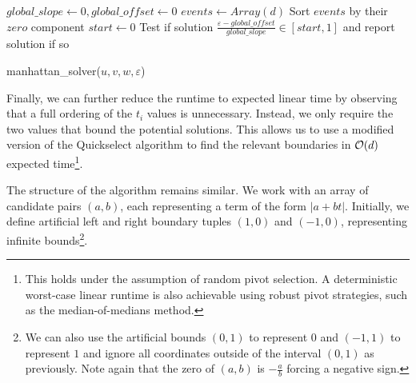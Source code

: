 \begin{algorithm}[ht]
  \DontPrintSemicolon
  \BlankLine
  \(global\_slope \gets 0, global\_offset \gets 0\) \;
  \(events \gets Array(d)\)
  Sort \(events\) by their \(zero\) component\;
  \(start \gets 0\)\;
  Test if solution \(\frac{\varepsilon - global\_offset}{global\_slope} \in [start, 1]\) and report solution if so\;

  \caption{manhattan\_solver(\(u, v, w, \varepsilon\))}
  \label{algo:solve_manhattan}
\end{algorithm}

Finally, we can further reduce the runtime to expected linear time by observing that a full ordering of the \(t_i\) values is unnecessary. Instead, we only require the two values that bound the potential solutions. This allows us to use a modified version of the Quickselect algorithm to find the relevant boundaries in \(\mathcal{O}(d)\) expected time\footnote{This holds under the assumption of random pivot selection. A deterministic worst-case linear runtime is also achievable using robust pivot strategies, such as the median-of-medians method.}. 

The structure of the algorithm remains similar. We work with an array of candidate pairs \((a, b)\), each representing a term of the form \(|a+bt|\). Initially, we define artificial left and right boundary tuples \((1, 0)\) and \((-1, 0)\), representing infinite bounds\footnote{We can also use the artificial bounds \((0, 1)\) to represent \(0\) and \((-1, 1)\) to represent \(1\) and ignore all coordinates outside of the interval \((0, 1)\) as previously. Note again that the zero of \((a, b)\) is \(-\frac{a}{b}\) forcing a negative sign.}. 

